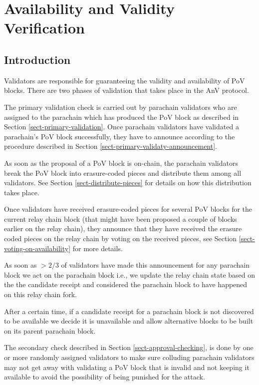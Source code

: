 \chapter{Availability and Validity Verification}

\section{Introduction}

Validators are responsible for guaranteeing the validity and availability of PoV blocks. 
There are two phases of validation that takes place in the AnV protocol. 

The primary validation check is carried out by parachain validators who are assigned to the parachain which has produced the PoV block as described in Section \ref{sect-primary-validation}. Once parachain validators have validated a parachain's PoV block successfully, they have to announce according to the procedure described in Section \ref{sect-primary-validaty-announcement}.

As soon as the proposal of a PoV block is on-chain, the parachain validators break the PoV block into erasure-coded pieces and distribute them among all validators. See Section \ref{sect-distribute-pieces} for details on how this distribution takes place.
	 
Once validators have received erasure-coded pieces for several PoV blocks for the current relay chain block (that might have been proposed a couple of blocks earlier on the relay chain), they announce that they have received the erasure coded pieces on the relay chain by voting on the received pieces, see Section \ref{sect-voting-on-availability} for more details. 

As soon as $>2/3$ of validators have made this announcement for any parachain block we act on the parachain block i.e., we update the relay chain state based on the the candidate receipt and considered the parachain block to have happened on this relay chain fork. 

After a certain time, if a candidate receipt for a parachain block is not discovered to be available we decide it is unavailable and allow alternative blocks to be built on its parent parachain block. 

The secondary check described in Section \ref{sect-approval-checking}, is done by one or more randomly assigned validators to make sure colluding parachain validators may not get away with validating a PoV block that is invalid and not keeping it available to avoid the possibility of being punished for the attack.

